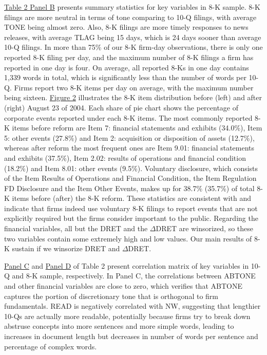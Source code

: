 \documentclass[a4paper]{article}
\begin{document}
\begin{spacing}{2}
\hyperref[T2PB]{Table 2 Panel B} presents summary statistics for key variables in 8-K sample. 8-K filings are more neutral in terms of tone comparing to 10-Q filings, with average TONE being almost zero. Also, 8-K filings are more timely responses to news releases, with average TLAG being 15 days, which is 24 days sooner than average 10-Q filings. In more than 75\% of our 8-K firm-day observations, there is only one reported 8-K filing per day, and the maximum number of 8-K filings a firm has reported in one day is four. On average, all reported 8-Ks in one day contains 1,339 words in total, which is significantly less than the number of words per 10-Q. Firms report two 8-K items per day on average, with the maximum number being sixteen. \hyperref[fig2]{Figure 2} illustrates the 8-K item distribution before (left) and after (right) August 23 of 2004. Each share of pie chart shows the percentage of corporate events reported under each 8-K items. The most commonly reported 8-K items before reform are Item 7: financial statements and exhibits (34.0\%), Item 5: other events (27.8\%) and Item 2: acquisition or disposition of assets (12.7\%), whereas after reform the most frequent ones are Item 9.01: financial statements and exhibits (37.5\%), Item 2.02: results of operations and financial condition (18.2\%) and Item 8.01: other events (9.5\%). Voluntary disclosure, which consists of the Item Results of Operations and Financial Condition, the Item Regulation FD Disclosure and the Item Other Events, makes up for 38.7\% (35.7\%) of total 8-K items before (after) the 8-K reform. These statistics are consistent with  and indicate that firms indeed use voluntary 8-K filings to report events that are not explicitly required but the firms consider important to the public. Regarding the financial variables, all but the DRET and the $\Delta$DRET are winsorized, so these two variables contain some extremely high and low values. Our main results of 8-K sustain if we winsorize DRET and $\Delta$DRET.

\hyperref[T2PC]{Panel C} and \hyperref[T2PD]{Panel D} of Table 2 present correlation matrix of key variables in 10-Q and 8-K sample, respectively. In Panel C, the correlations between ABTONE and other financial variables are close to zero, which verifies that ABTONE captures the portion of discretionary tone that is orthogonal to firm fundamentals. READ is negatively correlated with NW, suggesting that lengthier 10-Qs are actually more readable, potentially because firms try to break down abstruse concepts into more sentences and more simple words, leading to increases in document length but decreases in number of words per sentence and percentage of complex words.


\end{spacing}
\end{document}
